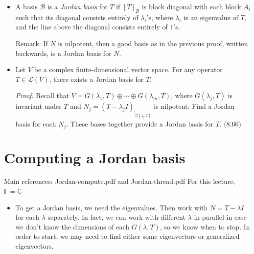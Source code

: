 \documentclass[11pt]{article}
\newcommand{\1}{\mathbf{1}}
\newcommand{\0}{\mathbf{0}}
\newcommand{\B}{\mathcal{B}}
\newcommand{\C}{\mathbb{C}}
\newcommand{\F}{\mathbb{F}}
\DeclareMathOperator{\myspan}{\mathsf{span}}
\newcommand{\spitem}{\item[$\circ$]}
\begin{document}
{\begin{itemize}
Since $N w_{m'+j} \in U_{k+1}$, it is a linear combination of $\B_{k+1}$, which means a linear combination of $N \tilde{\B}_k$ which means $N x_j$ for some $x \in \myspan \tilde{\B}_k$.
Take $v_{m'+j} = w_{m'+j} - x_j$ so $N v_{m'+j} = \0$.
Take the collection $\B_k$ obtained by adding $v_{m'+1},\dots,v_{m}$ to $\tilde{\B}_k$.
Then $\B_k$ spans $U_k$, so it is a basis, and moreover it is a good basis.
\hfill
(8.55)

\item

A basis $\mathcal{B}$ is a {\it Jordan basis} for $T$ if $[T]_{\mathcal{B}}$ is block diagonal with each block $A_i$ such that its diagonal consists entirely of $\lambda_i$'s, where $\lambda_i$ is an eigenvalue of $T$, and the line above the diagonal consists entirely of $1$'s.

Remark:
If $N$ is nilpotent, then a good basis as in the previous proof, written backwards, is a Jordan basis for $N$.

\item

Let $V$ be a complex finite-dimensional vector space. For any operator $T\in\mathcal{L}(V)$, there exists a Jordan basis for $T$.

\emph{Proof.}
Recall that $V= G(\lambda_1,T) \oplus \cdots \oplus G(\lambda_m, T)$, where $G(\lambda_j,T)$ is invariant under $T$ and $N_j = (T-\lambda_j I)_{|_{G(\lambda_j,T)}}$ is nilpotent.
Find a Jordan basis for each $N_j$.
These bases together provide a Jordan basis for $T$.
\hfill
(8.60)

%

\end{itemize}


\clearpage
\section{Computing a Jordan basis}

Main references:
\textsf{Jordan-compute.pdf} and \textsf{Jordan-thread.pdf}
\hfill
For this lecture, $\F = \C$

\begin{itemize}

\spitem

To get a Jordan basis, we need the eigenvalues.
Then work with $N=T-\lambda I$ for each $\lambda$ separately.
In fact, we can work with different $\lambda$ in parallel in case we don't know the dimensions of each $G(\lambda,T)$, so we know when to stop.
In order to start, we may need to find either some eigenvectors or generalized eigenvectors.


\end{itemize}}
\end{document}
